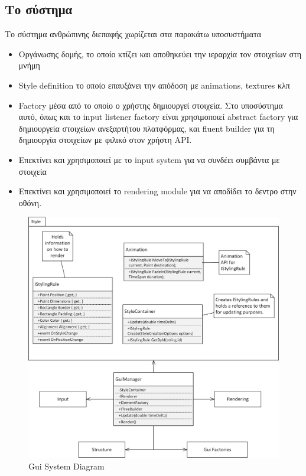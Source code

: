 \subsection{Το σύστημα}	
Το σύστημα ανθρώπινης διεπαφής χωρίζεται στα παρακάτω υποσυστήματα
	\begin{itemize}
		\item Οργάνωσης δομής, το οποίο κτίζει και αποθηκεύει την ιεραρχία τον στοιχείων στη μνήμη
		\item Style definition το οποίο επαυξάνει την απόδοση με animations, textures κλπ
		\item Factory μέσα από το οποίο ο χρήστης δημιουργεί στοιχεία. Στο υποσύστημα αυτό, όπως και το input listener factory είναι χρησιμοποιεί abstract factory για δημιουργεία στοιχείων ανεξαρτήτου πλατφόρμας, και fluent builder για τη δημιουργία στοιχείων με φιλικό στον χρήστη \gls{API}.
		\item Επεκτίνει και χρησιμοποιεί με το input system για να συνδέει συμβάντα με στοιχεία
		\item Επεκτίνει και χρησιμοποιεί το rendering module για να αποδίδει το δεντρο στην οθόνη.
	\end{itemize}
	\begin{figure}[h!]
		\centering
		\includegraphics[width=165mm]{Images/gui_system}
		\caption{Gui System Diagram}
		\label{fig:gui_system}
	\end{figure}	

